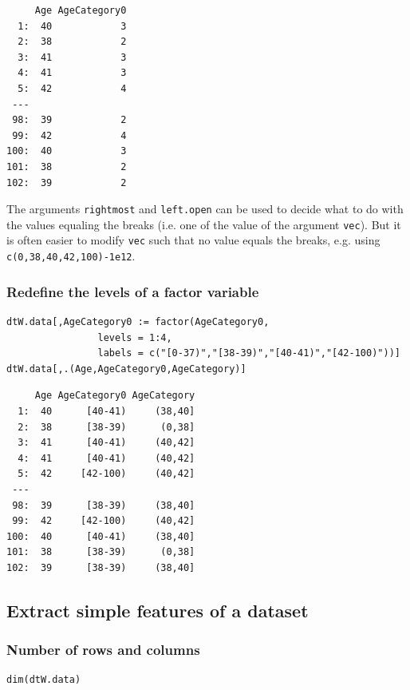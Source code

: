 \documentclass{article}
\begin{document}
\begin{verbatim}
     Age AgeCategory0
  1:  40            3
  2:  38            2
  3:  41            3
  4:  41            3
  5:  42            4
 ---                 
 98:  39            2
 99:  42            4
100:  40            3
101:  38            2
102:  39            2
\end{verbatim}

The arguments \texttt{rightmost} and \texttt{left.open} can be used to decide what
to do with the values equaling the breaks (i.e. one of the value of
the argument \texttt{vec}). But it is often easier to modify \texttt{vec} such that no value
equals the breaks, e.g. using \texttt{c(0,38,40,42,100)-1e12}.

\subsubsection{Redefine the levels of a factor variable}
\label{sec:org0bb0395}

\lstset{language=r,label= ,caption= ,captionpos=b,numbers=none}
\begin{lstlisting}
dtW.data[,AgeCategory0 := factor(AgeCategory0, 
				levels = 1:4, 
				labels = c("[0-37)","[38-39)","[40-41)","[42-100)"))]
dtW.data[,.(Age,AgeCategory0,AgeCategory)]
\end{lstlisting}

\begin{verbatim}
     Age AgeCategory0 AgeCategory
  1:  40      [40-41)     (38,40]
  2:  38      [38-39)      (0,38]
  3:  41      [40-41)     (40,42]
  4:  41      [40-41)     (40,42]
  5:  42     [42-100)     (40,42]
 ---                             
 98:  39      [38-39)     (38,40]
 99:  42     [42-100)     (40,42]
100:  40      [40-41)     (38,40]
101:  38      [38-39)      (0,38]
102:  39      [38-39)     (38,40]
\end{verbatim}

\subsection{Extract simple features of a dataset}
\label{sec:org886a94e}
\subsubsection{Number of rows and columns}
\label{sec:org5a55ef6}
\lstset{language=r,label= ,caption= ,captionpos=b,numbers=none}
\begin{lstlisting}
dim(dtW.data)
\end{lstlisting}
\end{document}
